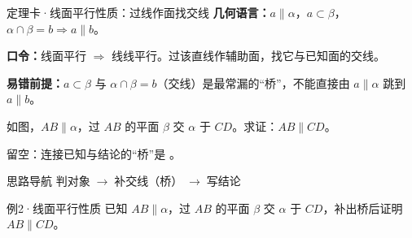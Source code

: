 \documentclass{exam-zh}
\begin{document}
\begin{eduSolutionBox}{定理卡·线面平行性质：过线作面找交线}
  \begingroup
  \setlength{\parskip}{2.5mm}
\textbf{几何语言：}$a\parallel\alpha$，$a\subset\beta$，$\alpha\cap\beta=b\Rightarrow a\parallel b$。\par
\textbf{口令：}线面平行 $\Rightarrow$ 线线平行。过该直线作辅助面，找它与已知面的交线。\par
\textbf{易错前提：}$a\subset\beta$ 与 $\alpha\cap\beta=b$（交线）是最常漏的“桥”，不能直接由 $a\parallel\alpha$ 跳到 $a\parallel b$。\par
  \endgroup
\end{eduSolutionBox}




\begin{eduProblemBlock}[例2·线面平行性质]
如图，$AB\parallel\alpha$，过 $AB$ 的平面 $\beta$ 交 $\alpha$ 于 $CD$。求证：$AB\parallel CD$。
\par\noindent 留空：连接已知与结论的“桥”是 \underline{\hspace{20mm}}。

\end{eduProblemBlock}





\begin{eduAuxItem}{思路导航}
判对象$\;\to\;$补交线（桥）$\;\to\;$写结论\end{eduAuxItem}




\begin{eduSubQuestionItem}{例2·线面平行性质}
已知 $AB\parallel\alpha$，过 $AB$ 的平面 $\beta$ 交 $\alpha$ 于 $CD$，补出桥后证明 $AB\parallel CD$。\end{eduSubQuestionItem}

\begin{eduDualExplain}
  \begin{eduExplainLeft}
  \end{eduExplainLeft}

  \begin{eduExplainRight}
  \end{eduExplainRight}
\end{eduDualExplain}
\end{document}
